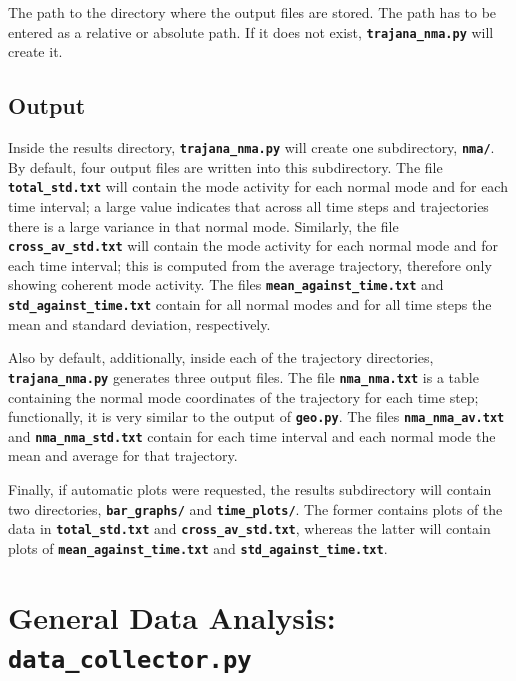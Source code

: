 \documentclass[a4paper,10pt,DIV=15,openany]{scrbook}
\newcommand{\ttt}[1]{\textbf{\texttt{#1}}}
\begin{document}
The path to the directory where the output files are stored.
The path has to be entered as a relative or absolute path.
If it does not exist, \ttt{trajana\_nma.py} will create it.

\subsection{Output}

Inside the results directory, \ttt{trajana\_nma.py} will create one subdirectory, \ttt{nma/}.
By default, four output files are written into this subdirectory.
The file \ttt{total\_std.txt} will contain the mode activity for each normal mode and for each time interval; a large value indicates that across all time steps and trajectories there is a large variance in that normal mode.
Similarly, the file \ttt{cross\_av\_std.txt} will contain the mode activity for each normal mode and for each time interval; this is computed from the average trajectory, therefore only showing coherent mode activity.
The files \ttt{mean\_against\_time.txt} and \ttt{std\_against\_time.txt} contain for all normal modes and for all time steps the mean and standard deviation, respectively.

Also by default, additionally, inside each of the trajectory directories, \ttt{trajana\_nma.py} generates three output files.
The file \ttt{nma\_nma.txt} is a table containing the normal mode coordinates of the trajectory for each time step; functionally, it is very similar to the output of \ttt{geo.py}.
The files \ttt{nma\_nma\_av.txt} and \ttt{nma\_nma\_std.txt} contain for each time interval and each normal mode the mean and average for that trajectory.

Finally, if automatic plots were requested, the results subdirectory will contain two directories, \ttt{bar\_graphs/} and \ttt{time\_plots/}.
The former contains plots of the data in \ttt{total\_std.txt} and \ttt{cross\_av\_std.txt}, whereas the latter will contain plots of \ttt{mean\_against\_time.txt} and \ttt{std\_against\_time.txt}.








\section{General Data Analysis: \ttt{data\_collector.py}}\label{sec:data_collector.py}
\end{document}

